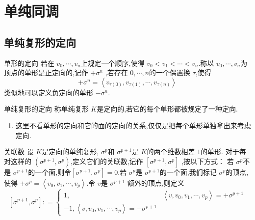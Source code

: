 \documentclass[../../几何与拓扑.tex]{subfiles}
\begin{document}
    
\chapter{单纯同调}

\section{单纯复形的定向}
    \begin{definition}{单形的定向}
        若在 \(   v_0,\cdots,v_{n}   \)上规定一个顺序,使得 \(  v_0< v_1<\cdots <v_{n}  \).称以  \(   v_0,\cdots,v_{n}   \)为顶点的单形是正定向的,记作 \(  +  \sigma ^{n}  \) ,若存在 \(  0,\cdots ,n  \)的一个偶置换 \(  \tau   \),使得  \[
        +  \sigma ^{n}  =  \left< v_{\tau \left( 0 \right) },v_{\tau \left( 1 \right) },\cdots , v_{\tau \left( n \right) } \right>
        \]     类似地可以定义负定向的单形 \(  - \sigma ^{n}  \). 
    \end{definition}

    \begin{definition}{单纯复形的定向}
        称单纯复形 \(  K  \)是定向的,若它的每个单形都被规定了一种定向. 
    \end{definition}

    \begin{remark}
        \begin{enumerate}
            \item 这里不看单形的定向和它的面的定向的关系,仅仅是把每个单形单独拿出来考虑定向.
        \end{enumerate}
        
    \end{remark}



    \begin{definition}{关联数}
        设 \(  K  \)是定向的单纯复形, \(   \sigma ^{p}  \)和 \(   \sigma ^{p+ 1}  \)是 \(  K  \)的两个维数相差 \(  1  \)的单形.
        对于每对这样的 \(  \left(  \sigma ^{p+ 1}, \sigma ^{p} \right)   \),定义它们的关联数,记作 \(  [ \sigma ^{p+ 1}, \sigma ^{p}]  \)      ,按以下方式：
        若 \(   \sigma ^{p}  \)不是 \(   \sigma ^{p+ 1}  \)的一个面,则令\(  [ \sigma ^{p+ 1}, \sigma ^{p}]  = 0\).若 \(   \sigma ^{p}  \)是 \(   \sigma ^{p+ 1}  \)的一个面,我们标记 \(   \sigma ^{p}  \)的顶点,使得
         \(  +  \sigma ^{p} = \left< v_0,v_1,\cdots,v_{p}  \right>  \).令 \(  v  \)是 \(   \sigma ^{p+ 1}  \)         额外的顶点,则定义 \[
         [ \sigma ^{p+ 1}, \sigma ^{p}]: =  \begin{cases} 1,& \left<v, v_0,v_1,\cdots,v_{p}  \right>= +  \sigma ^{p+ 1}\\ 
          -1,\left<v, v_0,v_1,\cdots,v_{p}  \right>= -  \sigma ^{p+ 1} \end{cases} 
         \]
    \end{definition}
\end{document}
